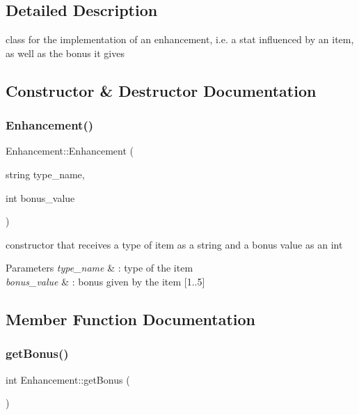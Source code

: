 \subsection{Detailed Description}
class for the implementation of an enhancement, i.\+e. a stat influenced by an item, as well as the bonus it gives 

\subsection{Constructor \& Destructor Documentation}
\hypertarget{class_enhancement_a808475a07d34038bdccd59e69d8ad2df}{}\label{class_enhancement_a808475a07d34038bdccd59e69d8ad2df} 
\subsubsection{\texorpdfstring{Enhancement()}{Enhancement()}}
{\footnotesize\ttfamily Enhancement\+::\+Enhancement (\begin{DoxyParamCaption}\item[{string}]{type\+\_\+name,  }\item[{int}]{bonus\+\_\+value }\end{DoxyParamCaption})}

constructor that receives a type of item as a string and a bonus value as an int 
\begin{DoxyParams}{Parameters}
{\em type\+\_\+name} & \+: type of the item \\
\hline
{\em bonus\+\_\+value} & \+: bonus given by the item \mbox{[}1..5\mbox{]} \\
\hline
\end{DoxyParams}


\subsection{Member Function Documentation}
\hypertarget{class_enhancement_afd0ea7d414468cf507a4673fd066fd89}{}\label{class_enhancement_afd0ea7d414468cf507a4673fd066fd89} 
\subsubsection{\texorpdfstring{get\+Bonus()}{getBonus()}}
{\footnotesize\ttfamily int Enhancement\+::get\+Bonus (\begin{DoxyParamCaption}{ }\end{DoxyParamCaption})}

